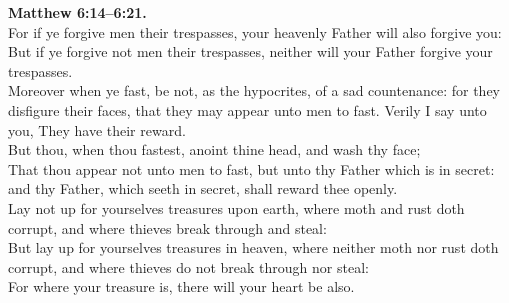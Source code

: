 \documentclass[12pt]{article} %
\begin{document}
{\begin{minipage}[t]{0.45\textwidth}
\textbf{Matthew 6:14--6:21.}\\
For if ye forgive men their trespasses, your heavenly Father will also forgive you:\\
But if ye forgive not men their trespasses, neither will your Father forgive your trespasses.\\
Moreover when ye fast, be not, as the hypocrites, of a sad countenance: for they disfigure their faces, that they may appear unto men to fast. Verily I say unto you, They have their reward.\\
But thou, when thou fastest, anoint thine head, and wash thy face;\\
That thou appear not unto men to fast, but unto thy Father which is in secret: and thy Father, which seeth in secret, shall reward thee openly.\\
Lay not up for yourselves treasures upon earth, where moth and rust doth corrupt, and where thieves break through and steal:\\
But lay up for yourselves treasures in heaven, where neither moth nor rust doth corrupt, and where thieves do not break through nor steal:\\
For where your treasure is, there will your heart be also.\\

\end{minipage}}
\vspace*{\fill}
\newpage
\huge%
\vspace*{\fill}
\begin{spacing}{1.0}
\end{spacing}
\vspace*{\fill}
\end{document}
